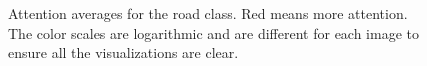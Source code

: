 \begin{figure}[ht]
{	}
	\caption[Road attention averages]{
		Attention averages for the road class. Red means more attention. The color
		scales are logarithmic and are different for each image to ensure all the visualizations
		are clear.
		}
\label{fig:average_road}
\end{figure}

